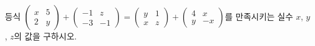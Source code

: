 등식 $\begin{pmatrix} x & 5 \\ 2 & y \end{pmatrix}+\begin{pmatrix} -1 & z \\ -3 & -1 \end{pmatrix}=\begin{pmatrix} y & 1 \\ x & z \end{pmatrix}+\begin{pmatrix} 4 & x \\ y & -x \end{pmatrix}$를 만족시키는 실수 $x$, $y$, $z$의 값을 구하시오.
